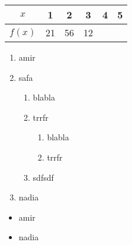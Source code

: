 \documentclass[12pt]{article}
\begin{document}
\begin{tabular}{c|ccccc}
$x$ &1&2&3&4&5 \\ \hline
$f(x)$ &21&56&12

\end{tabular}

\begin{enumerate}
\item amir
\item	safa
	\begin{enumerate}
	\item blabla \\
	
	
	
	\item trrfr
			\begin{enumerate}
	\item blabla \\
	
	
	\item trrfr
	
	
	
	\end{enumerate}
	
	\item sdfsdf
	\end{enumerate}
\item nadia
\end{enumerate}
\begin{itemize}
\item amir
\item nadia
\end{itemize}
\end{document}
